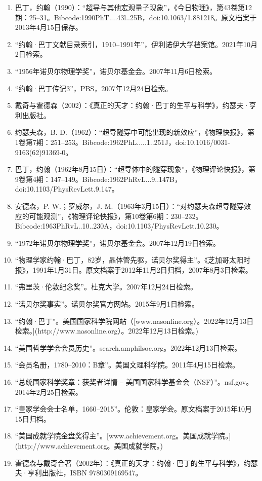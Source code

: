 \begin{enumerate}
\item 巴丁，约翰（1990）：“超导与其他宏观量子现象”，《今日物理》，第43卷第12期：25–31。Bibcode:1990PhT....43l..25B，doi:10.1063/1.881218。原文档案于2013年4月15日保存。
\item “约翰·巴丁文献目录索引，1910–1991年”，伊利诺伊大学档案馆。2021年10月2日检索。
\item “1956年诺贝尔物理学奖”，诺贝尔基金会。2007年11月6日检索。
\item “约翰·巴丁传记3”，PBS，2007年12月24日检索。
\item 戴奇与霍德森（2002）：《真正的天才：约翰·巴丁的生平与科学》，约瑟夫·亨利出版社。
\item 约瑟夫森，B. D.（1962）：“超导隧穿中可能出现的新效应”，《物理快报》，第1卷第7期：251–253。Bibcode:1962PhL.....1..251J，doi:10.1016/0031-9163(62)91369-0。
\item 巴丁，约翰（1962年8月15日）：“超导体中的隧穿现象”，《物理评论快报》，第9卷第4期：147–149。Bibcode:1962PhRvL...9..147B，doi:10.1103/PhysRevLett.9.147。
\item 安德森，P. W.；罗威尔，J. M.（1963年3月15日）：“对约瑟夫森超导隧穿效应的可能观测”，《物理评论快报》，第10卷第6期：230–232。Bibcode:1963PhRvL..10..230A，doi:10.1103/PhysRevLett.10.230。
\item “1972年诺贝尔物理学奖”，诺贝尔基金会。2007年12月19日检索。
\item “物理学家约翰·巴丁，82岁，晶体管先驱，诺贝尔奖得主”。《芝加哥太阳时报》，1991年1月31日。原文档案于2012年11月2日归档，2007年8月3日检索。
\item “弗里茨·伦敦纪念奖”。杜克大学。2007年12月24日检索。
\item “诺贝尔奖事实”。诺贝尔奖官方网站。2015年9月1日检索。
\item “约翰·巴丁”。美国国家科学院网站（[www.nasonline.org）。2022年12月13日检索。](http://www.nasonline.org）。2022年12月13日检索。)
\item “美国哲学学会会员历史”。search.amphilsoc.org。2022年12月13日检索。
\item “会员名册，1780–2010：B章”。美国文理科学院。2011年4月15日检索。
\item “总统国家科学奖章：获奖者详情 – 美国国家科学基金会（NSF）”。nsf.gov。2014年2月25日检索。
\item “皇家学会会士名单，1660–2015”。伦敦：皇家学会。原文档案于2015年10月15日归档。
\item “美国成就学院金盘奖得主”。[www.achievement.org。美国成就学院。](http://www.achievement.org。美国成就学院。)
\item 霍德森与戴奇合著（2002年）：《真正的天才：约翰·巴丁的生平与科学》，约瑟夫·亨利出版社，ISBN 9780309169547。

\end{enumerate}
